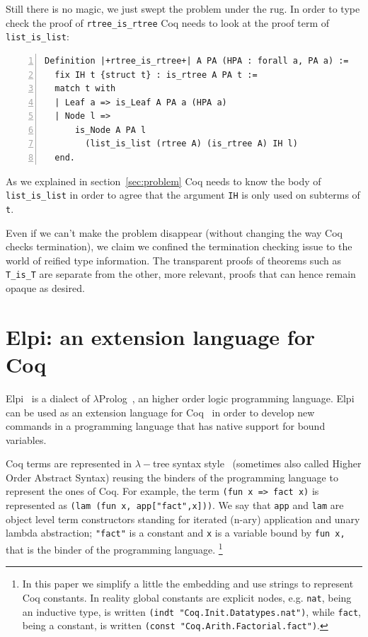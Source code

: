 \documentclass[sigplan,10pt,review]{acmart}\settopmatter{printfolios=true,printccs=false,printacmref=false}
\begin{document}
Still there is no magic, we just swept the problem under the rug.
In order to type check the proof
of \lstinline+rtree_is_rtree+ Coq needs to look at the
proof term of \lstinline+list_is_list+:

\begin{minipage}{\textwidth}\begin{lstlisting}[numbers=left]
Definition |+rtree_is_rtree+| A PA (HPA : forall a, PA a) :=
  fix IH t {struct t} : is_rtree A PA t :=
  match t with
  | Leaf a => is_Leaf A PA a (HPA a)
  | Node l =>
      is_Node A PA l
        (list_is_list (rtree A) (is_rtree A) IH l)
  end.
\end{lstlisting}\end{minipage}

\noindent
As we explained in section~\ref{sec:problem} Coq needs to know the
body of  \lstinline+list_is_list+ in order to agree that the argument
\lstinline+IH+ is only used on subterms of \lstinline+t+.

Even if we can't make the problem disappear (without changing the way Coq
checks termination), we claim we confined the termination checking issue
to the world of reified type information. The transparent proofs of
theorems such as \lstinline+T_is_T+ are separate from the other, more
relevant, proofs that can hence remain opaque as desired.

\section{Elpi: an extension language for Coq} %
\label{sec:elpilang}

Elpi~\cite{dunchev:hal-01176856} is a dialect of
$\lambda$Prolog~\cite{miller_nadathur_2012}, an higher order logic
programming language. Elpi can be used as an extension language for
Coq~\cite{tassi:hal-01637063} in order to develop new commands in a programming
language that has native support for bound variables.

Coq terms are represented in $\lambda-$tree syntax
style~\cite{10.1007/3-540-44957-4_16} (sometimes also called
Higher Order Abstract Syntax) reusing the binders of the programming
language to represent the ones of Coq.
For example, the
term \lstinline+(fun x => fact x)+ is represented as
\lstinline+(lam (fun x, app["fact",x]))+. 
We say that \lstinline+app+ and \lstinline+lam+ are object level term
constructors standing for iterated (n-ary) application and unary lambda
abstraction; \lstinline+"fact"+ is a constant and \lstinline+x+ is a
variable bound by \lstinline+fun x,+ that is the binder
of the programming language.  \footnote{In this paper we simplify
a little the embedding and use strings to represent Coq constants.
In reality
global constants are explicit nodes, e.g. \lstinline+nat+,
being an inductive type,
is written \lstinline+(indt "Coq.Init.Datatypes.nat")+,
while \lstinline+fact+, being a constant,
is written \lstinline+(const "Coq.Arith.Factorial.fact")+.}
\end{document}
